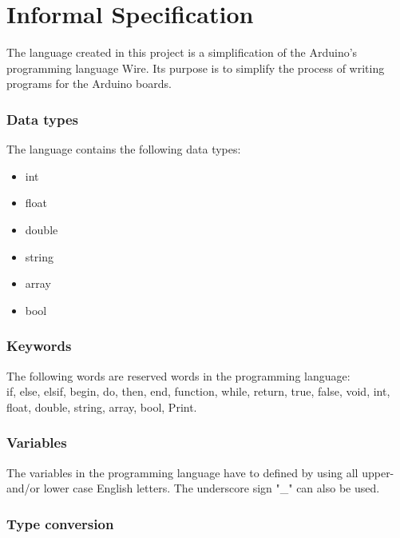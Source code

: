 \chapter{Informal Specification}\label{analysis:informal-specification}

The language created in this project is a simplification of the Arduino's programming language Wire. Its purpose is to simplify the process of writing programs for the Arduino boards.   

\subsection{Data types}
The language contains the following data types: 
\begin{itemize}
\item int
\item float
\item double
\item string
\item array
\item bool
\end{itemize}

\subsection{Keywords}
The following words are reserved words in the programming language:\\
if, else, elsif, begin, do, then, end, function, while, return, true, false, void, int, float, double, string, array, bool, Print.

\subsection{Variables}
The variables in the programming language have to defined by using all upper- and/or lower case English letters. The underscore sign "\_" can also be used. 

\subsection{Type conversion}
